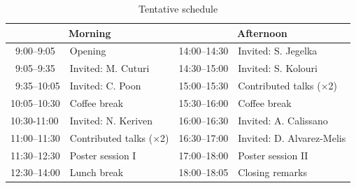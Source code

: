 \documentclass{article}
\begin{document}


\begin{table}[t]
    \centering
    \caption{Tentative schedule}
    \begin{tabular}{ll|ll}
        \toprule
        \multicolumn{2}{c}{\textbf{Morning}} & \multicolumn{2}{c}{\textbf{Afternoon}} \\
        \midrule
        \;~9:00--9:05 & Opening & 14:00--14:30 & Invited: S. Jegelka \\
        \;~9:05--9:35 & Invited: M. Cuturi & 14:30--15:00 & Invited: S. Kolouri \\
        \;~9:35--10:05 & Invited: C. Poon & 15:00--15:30 & Contributed talks ($\times$2) \\
        10:05--10:30 & Coffee break & 15:30--16:00 & Coffee break \\ 
        10:30-11:00 & Invited: N. Keriven & 16:00--16:30 & Invited: A. Calissano \\
        11:00--11:30 & Contributed talks ($\times$2) & 16:30--17:00 & Invited: D. Alvarez-Melis \\
        11:30--12:30 & Poster session I & 17:00--18:00 & Poster session II  \\
        12:30--14:00 & Lunch break & 18:00--18:05 & Closing remarks \\
        \bottomrule
    \end{tabular}
    \label{tab:schedule}
    \vspace{-.9em}
\end{table}
\end{document}
